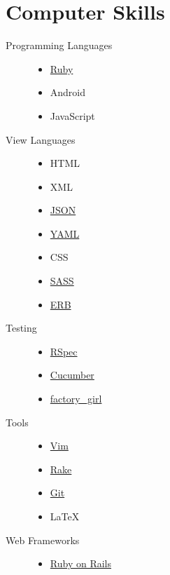 \documentclass[a4paper,10pt]{article}
\begin{document}
\section{Computer Skills}
\begin{description}
  \item[Programming Languages] \hfill
    \begin{itemize}
      \item \href{https://www.ruby-lang.org/}{Ruby}
      \item Android
      \item JavaScript
    \end{itemize}
  \item[View Languages] \hfill
    \begin{itemize}
      \item HTML
      \item XML
      \item \href{http://json.org}{JSON}
      \item \href{http://www.yaml.org}{YAML}
      \item CSS
      \item \href{http://sass-lang.com}{SASS}
      \item \href{http://ruby-doc.org/stdlib/libdoc/erb/rdoc/ERB.html}{ERB}
    \end{itemize}
  \item[Testing] \hfill
    \begin{itemize}
      \item \href{http://rspec.info}{RSpec}
      \item \href{http://cukes.info}{Cucumber}
      \item \href{https://github.com/thoughtbot/factory_girl}{factory\_girl}
    \end{itemize}
  \item[Tools] \hfill
    \begin{itemize}
      \item \href{http://www.vim.org}{Vim}
      \item \href{https://github.com/ruby/rake}{Rake}
      \item \href{http://git-scm.com}{Git}
      \item {\fb \LaTeX}\setmainfont[SmallCapsFont=Fontin-SmallCaps.otf]{Fontin.otf}
    \end{itemize}
  \item[Web Frameworks] \hfill
    \begin{itemize}
      \item \href{http://rubyonrails.org}{Ruby on Rails}

\end{itemize}
\end{description}
\end{document}
